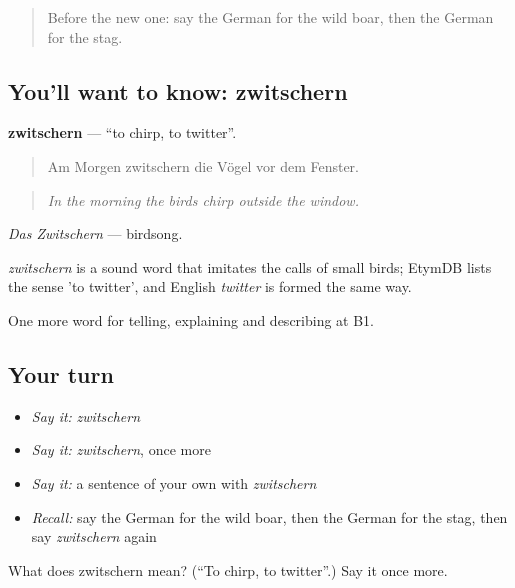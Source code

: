 \label{lesson:GE-C458-zwitschern}



\begin{quote}
Before the new one: say the German for the wild boar, then the German for the stag.
\end{quote}

\subsection*{You'll want to know: zwitschern}
\textbf{zwitschern} — \textquotedblleft{}to chirp, to twitter\textquotedblright{}.

\begin{quote}
Am Morgen zwitschern die Vögel vor dem Fenster.
\end{quote}

\begin{quote}
\emph{In the morning the birds chirp outside the window.}
\end{quote}

\emph{Das Zwitschern} — birdsong.

\begin{cousinweb}
\emph{zwitschern} is a sound word that imitates the calls of small birds; EtymDB lists the sense 'to twitter', and English \emph{twitter} is formed the same way.
\end{cousinweb}

\begin{grammarlens}[title={What you've built}]
One more word for telling, explaining and describing at B1.
\end{grammarlens}

\subsection*{Your turn}
\begin{itemize}
\raggedright
  \item \emph{Say it:} \emph{zwitschern}
  \item \emph{Say it:} \emph{zwitschern}, once more
  \item \emph{Say it:} a sentence of your own with \emph{zwitschern}
  \item \emph{Recall:} say the German for the wild boar, then the German for the stag, then say \emph{zwitschern} again
\end{itemize}

\begin{tcolorbox}[breakable,colback=teal!4,colframe=teal!35!black,title={Before you move on}]
What does zwitschern mean? (\textquotedblleft{}To chirp, to twitter\textquotedblright{}.) Say it once more.
\end{tcolorbox}
